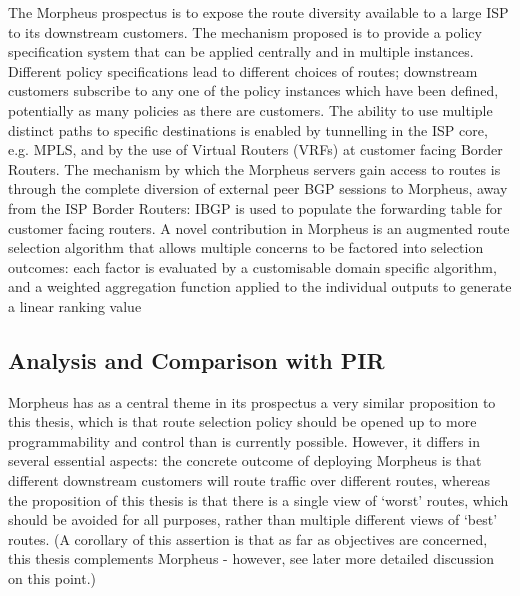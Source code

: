 The Morpheus prospectus is to expose the route diversity available to a large ISP to its downstream customers.
The mechanism proposed is to provide a policy specification system that can be applied centrally and in multiple instances. Different policy specifications lead to different choices of routes; downstream customers subscribe to any one of the policy instances which have been defined, potentially as many policies as there are customers.
The ability to use multiple distinct paths to specific destinations is enabled by tunnelling in the ISP core, e.g. MPLS, and by the use of Virtual Routers (VRFs) at customer facing Border Routers.
The mechanism by which the Morpheus servers gain access to routes is through the complete diversion of external peer BGP sessions to Morpheus, away from the ISP Border Routers: IBGP is used to populate the forwarding table for customer facing routers.
A novel contribution in Morpheus is an augmented route selection algorithm that allows multiple concerns to be factored into selection outcomes: each factor is evaluated by a customisable domain specific algorithm, and a weighted aggregation function applied to the individual outputs to generate a linear ranking value
\subsection{Analysis and Comparison with PIR}
Morpheus has as a central theme in its prospectus a very similar proposition to this thesis, which is that route selection policy should be opened up to more programmability and control than is currently possible.
However, it differs in several essential aspects:
the concrete outcome of deploying Morpheus is that different downstream customers will route traffic over different routes, whereas the proposition of this thesis is that there is a single view of ‘worst’ routes, which should be avoided for all purposes, rather than multiple different views of ‘best’ routes.
(A corollary of this assertion is that as far as objectives are concerned, this thesis complements Morpheus - however, see later more detailed discussion on this point.)

